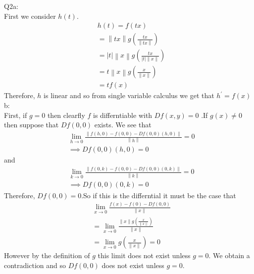 \documentclass[letterpaper]{article}
\newcommand{\norm}[1]{\left\lVert#1\right\rVert}
\begin{document}
Q2a:
\\ First we consider $h(t)$. 
\begin{align*}
    & h(t) = f(tx)
    \\ & = \norm{tx} g(\frac{tx}{\norm{tx}})
    \\ & = |t| \norm{x} g(\frac{tx}{|t|\norm{x}})
    \\ & = t \norm{x}g(\frac{x}{\norm{x}})
    \\ & = tf(x)
\end{align*}Therefore, $h$ is linear and so from single variable calculus we get that $h^\prime= f(x)$
\newline b:
\\ First, if $g=0 $ then clearfly $f$  is differntiable with $Df(x,y)=0$ .If $g(x) \neq 0$ then suppose that $Df(0,0)$ exists. We see that 
\begin{align*}
    &\lim_{h \rightarrow 0 } \frac{\norm{f(h,0) -f(0,0) -Df(0,0)(h,0)}}{\norm{h}}=0
    \\ & \implies Df(0,0) (h,0)= 0
\end{align*}
and 
\begin{align*}
    & \lim_{k \rightarrow 0} \frac{\norm{f(0,k) - f(0,0) -Df(0,0)(0,k)}}{\norm{k}}=0
    \\ & \implies Df(0,0)(0,k) = 0
\end{align*} 
Therefore, $Df(0,0) = 0$.So if this is the differntial it must be the case that 
\begin{align*}
    & \lim_{x \rightarrow 0 } \frac{f(x)- f(0)- Df(0,0)}{\norm{x}}
    \\ & = \lim_{x \rightarrow 0} \frac{\norm{x} g(\frac{x}{\norm{x}})}{\norm{x}}
    \\ & = \lim_{x \rightarrow 0} g(\frac{x}{\norm{x}}) = 0
\end{align*}However by the definition of $g$ this limit does not exist unless $g=0$. We obtain a contradiction and so $Df(0,0)$ does not exist unless $g=0$. 
\end{document}
